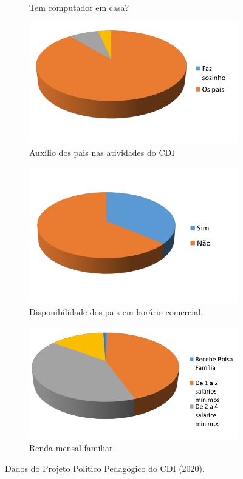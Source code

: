 \begin{figure}[!htbp]
\begin{subfigure}{.3\textwidth}
       \caption{Tem computador em casa?}
       \label{fig:tem_computador}
   \end{subfigure}
   \begin{subfigure}{.3\textwidth}
       \includegraphics[width=.9\linewidth,fbox]{figs/cdi/pai_auxilia_crianca_atividades.png}
       \caption{Auxílio dos pais nas atividades do CDI}
       \label{fig:pai_auxilia_crianca_atividades}
   \end{subfigure}%
   \begin{subfigure}{.3\textwidth}
       \includegraphics[width=.9\linewidth,fbox]{figs/cdi/disponibilidade_pais_horario_comercial.png}
       \caption{Disponibilidade dos pais em horário comercial.}
       \label{fig:disponibilidade_pais_horario_comercial}
   \end{subfigure}%
    \begin{subfigure}{.3\textwidth}
       \includegraphics[width=.9\linewidth,fbox]{figs/cdi/renda.png}
       \caption{Renda mensal familiar.}
       \label{fig:renda}
   \end{subfigure}%
   \caption{Dados do Projeto Político Pedagógico do CDI (2020).}
   \label{fig:contexto_ppp}
\end{figure}
